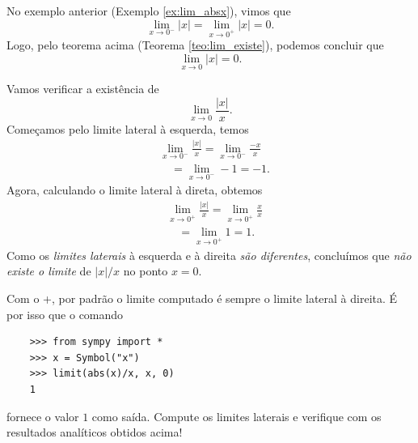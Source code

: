 \begin{exer}
  No exemplo anterior (Exemplo \ref{ex:lim_absx}), vimos que
  \begin{equation}
    \lim_{x\to 0^-} |x| = \lim_{x\to 0^+} |x| = 0.
  \end{equation}
  Logo, pelo teorema acima (Teorema \ref{teo:lim_existe}), podemos concluir que
  \begin{equation}
    \lim_{x\to 0} |x| = 0.
  \end{equation}
\end{exer}

\begin{exer}
  Vamos verificar a existência de
  \begin{equation}
    \lim_{x\to 0} \frac{|x|}{x}.
  \end{equation}
  Começamos pelo limite lateral à esquerda, temos
  \begin{align}
    & \lim_{x\to 0^-} \frac{|x|}{x} = \lim_{x\to 0^-} \frac{-x}{x} \\
    & \text{}\quad = \lim_{x\to 0^-} -1 = -1.
  \end{align}
  Agora, calculando o limite lateral à direta, obtemos
  \begin{align}
    & \lim_{x\to 0^+} \frac{|x|}{x} = \lim_{x\to 0^+} \frac{x}{x} \\
    & \text{}\quad = \lim_{x\to 0^+} 1 = 1.
  \end{align}
  Como os \emph{limites laterais} à esquerda e à direita \emph{são diferentes}, concluímos que \emph{não existe o limite} de $|x|/x$ no ponto $x=0$.

  \ifispython
  Com o {\python}+{\sympy}, por padrão o limite computado é sempre o limite lateral à direita. É por isso que o comando
  \begin{lstlisting}
    >>> from sympy import *
    >>> x = Symbol("x")
    >>> limit(abs(x)/x, x, 0)
    1
  \end{lstlisting}
  fornece o valor $1$ como saída. Compute os limites laterais e verifique com os resultados analíticos obtidos acima!
  \fi
\end{exer}

